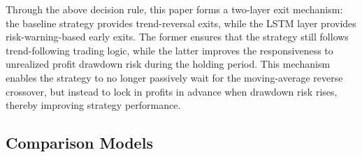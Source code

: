 \documentclass[12pt]{article}
\begin{document}

Through the above decision rule, this paper forms a two-layer exit mechanism: the baseline 
strategy provides trend-reversal exits, while the LSTM layer provides risk-warning-based early 
exits. The former ensures that the strategy still follows trend-following trading logic, while 
the latter improves the responsiveness to unrealized profit drawdown risk during the holding 
period. This mechanism enables the strategy to no longer passively wait for the moving-average 
reverse crossover, but instead to lock in profits in advance when drawdown risk rises, thereby 
improving strategy performance.

\subsection{Comparison Models}\label{subsec:comparison_models}
\end{document}
